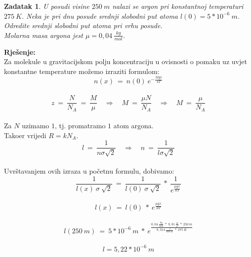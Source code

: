 \documentclass[a4paper,12pt]{article}
\newtheorem{ZDK}{Zadatak}[section]
\begin{document}
\newpage
\begin{ZDK}
	U posudi visine $250\ m$ nalazi se argon pri konstantnoj temperaturi $275\ K$. 
	Neka je pri dnu posude srednji slobodni put atoma $l(0)=5*10^{-6}\ m$.
	Odredite srednji slobodni put atoma pri vrhu posude. \\
	Molarna masa argona jest $\mu=0,04\ \frac{kg}{mol}$.
\end{ZDK}
\textbf{Rje\v{s}enje:} \\
\newline
Za molekule u gravitacijskom polju koncentraciju u ovisnosti o pomaku uz uvjet konstantne temperature mo\v{z}emo izraziti formulom:
\\
$$ n(x)\ =\ n(0)\ e^{-\frac{Mgx}{kT}} $$
\\
$$ z\ =\ \frac{N}{N_A}\ =\ \frac{M}{\mu} \quad \Rightarrow \quad M\ =\ \frac{\mu N}{N_A} \quad \Rightarrow \quad M\ =\ \frac{\mu}{N_A} $$
\\
Za $N$ uzimamo $1$, tj. promatramo $1$ atom argona. \\
Tako\dj er vrijedi $R=kN_A$.
\\
$$ l\ =\ \frac{1}{n \sigma \sqrt{2}} \quad \Rightarrow \quad n\ =\ \frac{1}{l \sigma \sqrt{2}} $$
\\
Uvr\v{s}tavanjem ovih izraza u po\v{c}etnu formulu, dobivamo:
\\
$$ \frac{1}{l(x)\ \sigma\ \sqrt{2}}\ =\ \frac{1}{l(0)\ \sigma\ \sqrt{2}}\ *\ \frac{1}{e^{\frac{\mu gx}{RT}}} $$
\\
$$ l(x)\ =\ l(0)\ *\ e^{\frac{\mu gx}{RT}}  $$
\\
$$ l(250\ m)\ =\ 5*10^{-6}\ m\ *\ e^{\frac{0,04\ \frac{kg}{mol}\ *\ 9,81\ \frac{m}{s^2}\ *\ 250\ m}{8,314\ \frac{J}{mol\ K}\ *\ 275\ K}} $$
\\
$$ l=5,22*10^{-6}\ m $$
\end{document}
